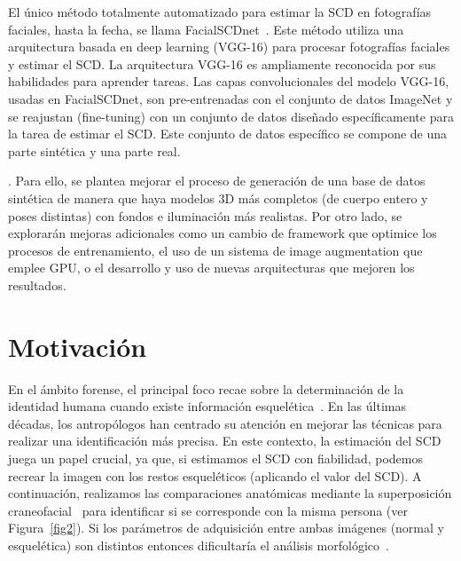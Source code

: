 El único método totalmente automatizado para estimar la SCD en fotografías faciales, hasta la fecha, se llama FacialSCDnet~\cite{14}. Este método utiliza una arquitectura basada en deep learning (VGG-16) para procesar fotografías faciales y estimar el SCD. La arquitectura VGG-16 es ampliamente reconocida por sus habilidades para aprender tareas. Las capas convolucionales del modelo VGG-16, usadas en FacialSCDnet, son pre-entrenadas con el conjunto de datos ImageNet y se reajustan (fine-tuning) con un conjunto de datos diseñado específicamente para la tarea de estimar el SCD. Este conjunto de datos específico se compone de una parte sintética y una parte real.

. Para ello, se plantea mejorar el proceso de generación de una base de datos sintética de manera que haya modelos 3D más completos (de cuerpo entero y poses distintas) con fondos e iluminación más realistas.
Por otro lado, se explorarán mejoras adicionales como un cambio de framework que optimice los procesos de entrenamiento, el uso de un sistema de image augmentation que emplee GPU, o el desarrollo y uso de nuevas arquitecturas que mejoren los resultados.


\section{Motivación}
En el ámbito forense, el principal foco recae sobre la determinación de la identidad humana cuando existe información esquelética~\cite{22}. En las últimas décadas, los antropólogos han centrado su atención en mejorar las técnicas para realizar una identificación más precisa. En este contexto, la estimación del SCD juega un papel crucial, ya que, si estimamos el SCD con fiabilidad, podemos recrear la imagen con los restos esqueléticos (aplicando el valor del SCD). A continuación, realizamos las comparaciones anatómicas mediante la superposición craneofacial~\cite{21} para identificar si se corresponde con la misma persona (ver Figura~\ref{fig2}). Si los parámetros de adquisición entre ambas imágenes (normal y esquelética) son distintos entonces dificultaría el análisis morfológico~\cite{23}.

